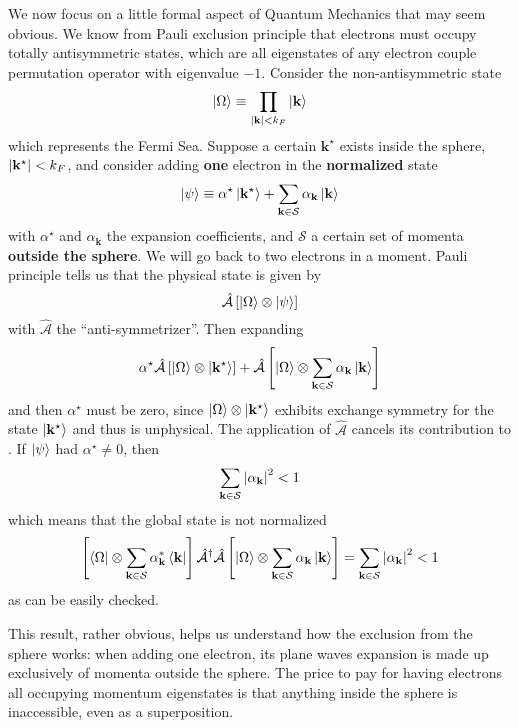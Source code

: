 We now focus on a little formal aspect of Quantum Mechanics that may seem obvious. We know from Pauli exclusion principle that electrons must occupy totally antisymmetric states, which are all eigenstates of any electron couple permutation operator with eigenvalue $-1$. Consider the non-antisymmetric state
\[
	\ket{\Omega} \equiv \prod_{\abs{\mathbf{k}} < k_F} \ket{\mathbf{k}}
\]
which represents the Fermi Sea. Suppose a certain $\mathbf{k}^\star$ exists inside the sphere, $\abs{\mathbf{k}^\star} < k_F$, and consider adding \textbf{one} electron in the \textbf{normalized} state
\[
	\ket{\psi} \equiv \alpha^\star \ket{\mathbf{k}^\star} + \sum_{\mathbf{k}\in\mathcal{S}} \alpha_\mathbf{k} \ket{\mathbf{k}}
\]
with $\alpha^\star$ and $\alpha_\mathbf{k}$ the expansion coefficients, and $\mathcal{S}$ a certain set of momenta \textbf{outside the sphere}. We will go back to two electrons in a moment. Pauli principle tells us that the physical state is given by
\[
	\hat{\mathcal{A}} \left[{\ket{\Omega}\otimes\ket{\psi}}\right]
\]
with $\hat{\mathcal{A}}$ the ``anti-symmetrizer''. Then expanding
\[
	\alpha^\star \hat{\mathcal{A}} \left[{\ket{\Omega}\otimes \ket{\mathbf{k}^\star}}\right] + \hat{\mathcal{A}} \left[{\ket{\Omega}\otimes\sum_{\mathbf{k}\in\mathcal{S}} \alpha_\mathbf{k} \ket{\mathbf{k}}}\right]
\]
and then $\alpha^\star$ must be zero, since $\ket{\Omega}\otimes \ket{\mathbf{k}^\star}$ exhibits exchange symmetry for the state $\ket{\mathbf{k}^\star}$ and thus is unphysical. The application of $\hat{\mathcal{A}}$ cancels its contribution to . If $\ket{\psi}$ had $\alpha^\star \neq 0$, then
\[
	\sum_{\mathbf{k}\in\mathcal{S}} \abs{\alpha_\mathbf{k}}^2 < 1
\]
which means that the global state is not normalized
\[
	\left[{\bra{\Omega}\otimes\sum_{\mathbf{k}\in\mathcal{S}} \alpha_\mathbf{k}^* \bra{\mathbf{k}}}\right] \hat{\mathcal{A}}^\dagger \hat{\mathcal{A}} \left[{\ket{\Omega}\otimes\sum_{\mathbf{k}\in\mathcal{S}} \alpha_\mathbf{k} \ket{\mathbf{k}}}\right] = \sum_{\mathbf{k}\in\mathcal{S}} \abs{\alpha_\mathbf{k}}^2 < 1
\]
as can be easily checked.

This result, rather obvious, helps us understand how the exclusion from the sphere works: when adding one electron, its plane waves expansion is made up exclusively of momenta outside the sphere. The price to pay for having electrons all occupying momentum eigenstates is that anything inside the sphere is inaccessible, even as a superposition.

